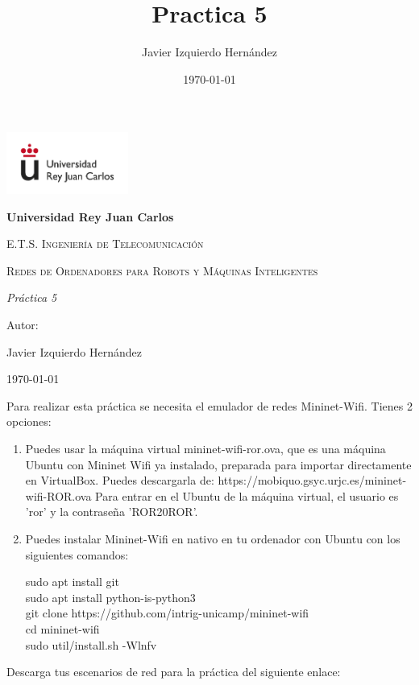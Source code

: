 \documentclass[12pt, a4paper]{report}
\title{Practica 5}
\author{Javier Izquierdo Hernández}
\date{\today}
\begin{document}
	\begin{titlepage}
		\centering
		{\includegraphics[width=0.3\textwidth]{logo}\par}
		\vspace{1cm}
		{\bfseries\LARGE Universidad Rey Juan Carlos \par}
		\vspace{1cm}
		{\scshape\Large E.T.S. Ingeniería de Telecomunicación \par}
		\vspace{3cm}
		{\scshape\Huge Redes de Ordenadores para Robots y Máquinas Inteligentes \par}
		\vspace{3cm}
		{\itshape\Large Práctica 5\par}
		\vfill
		{\Large Autor: \par}
		{\Large Javier Izquierdo Hernández \par}
		\vfill
		{\Large \today \par}
	\end{titlepage}

\newpage
\renewcommand{\contentsname}{Contenidos}
\tableofcontents
\newpage

Para realizar esta práctica se necesita el emulador de redes Mininet-Wifi. Tienes 2 opciones:

\begin{enumerate}
	\item Puedes usar la máquina virtual mininet-wifi-ror.ova, que es una máquina Ubuntu con Mininet	Wifi ya instalado, preparada para importar directamente en VirtualBox.
	Puedes descargarla de: https://mobiquo.gsyc.urjc.es/mininet-wifi-ROR.ova
	Para entrar en el Ubuntu de la máquina virtual, el usuario es ’ror’ y la contraseña ’ROR20ROR’.
	\item Puedes instalar Mininet-Wifi en nativo en tu ordenador con Ubuntu con los siguientes comandos:
	\begin{center}
		sudo apt install git\\
		sudo apt install python-is-python3\\
		git clone https://github.com/intrig-unicamp/mininet-wifi\\
		cd mininet-wifi\\
		sudo util/install.sh -Wlnfv
	\end{center}
\end{enumerate}
Descarga tus escenarios de red para la práctica del siguiente enlace:
\end{document}
